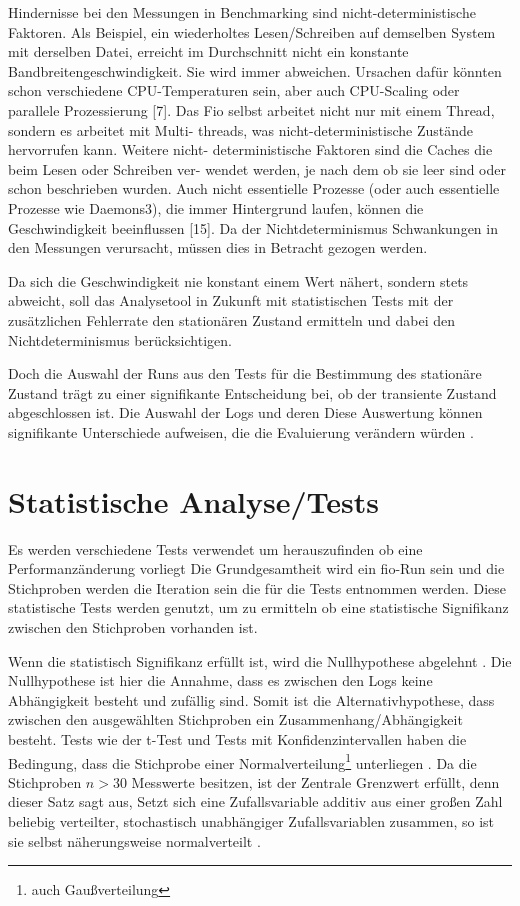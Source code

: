 Hindernisse bei den Messungen in Benchmarking sind nicht-deterministische Faktoren.
Als Beispiel, ein wiederholtes Lesen/Schreiben auf demselben System mit derselben Datei, erreicht im Durchschnitt nicht ein konstante Bandbreitengeschwindigkeit. 
Sie wird immer abweichen. Ursachen dafür könnten schon verschiedene CPU-Temperaturen sein, 
aber auch CPU-Scaling oder parallele Prozessierung [7]. Das Fio
selbst arbeitet nicht nur mit einem Thread, sondern es arbeitet mit Multi-
threads, was nicht-deterministische Zustände hervorrufen kann. Weitere nicht-
deterministische Faktoren sind die Caches die beim Lesen oder Schreiben ver-
wendet werden, je nach dem ob sie leer sind oder schon beschrieben wurden.
Auch nicht essentielle Prozesse (oder auch essentielle Prozesse wie Daemons3),
die immer Hintergrund laufen, können die Geschwindigkeit beeinflussen [15].
Da der Nichtdeterminismus Schwankungen in den Messungen verursacht, müssen dies in Betracht gezogen werden.

Da sich die Geschwindigkeit nie konstant einem Wert nähert, sondern stets
abweicht, soll das Analysetool in Zukunft mit statistischen Tests mit der zusätzlichen Fehlerrate den stationären
Zustand ermitteln und dabei den Nichtdeterminismus berücksichtigen.

Doch die Auswahl der Runs aus den Tests für die Bestimmung des stationäre Zustand trägt zu einer signifikante Entscheidung bei,
 ob der transiente Zustand abgeschlossen ist.
Die Auswahl der Logs und deren Diese Auswertung können signifikante Unterschiede aufweisen, die die Evaluierung
verändern würden \cite{when_stop_tests}.



\section{Statistische Analyse/Tests}
Es werden verschiedene Tests verwendet um herauszufinden ob eine Performanzänderung vorliegt \cite{statistically_rigorous}
Die Grundgesamtheit wird ein fio-Run sein und die Stichproben werden die Iteration sein die für die Tests entnommen werden.
Diese statistische Tests werden genutzt, um zu ermitteln ob eine statistische Signifikanz zwischen den Stichproben vorhanden ist.

Wenn die statistisch Signifikanz erfüllt ist, wird die Nullhypothese abgelehnt \cite{inferenzstatistik}.
Die Nullhypothese ist hier die Annahme, dass es zwischen den Logs keine Abhängigkeit besteht und zufällig sind.
Somit ist die Alternativhypothese, dass zwischen den ausgewählten Stichproben ein Zusammenhang/Abhängigkeit besteht.
Tests wie der t-Test und Tests mit Konfidenzintervallen haben die Bedingung, 
dass die Stichprobe einer Normalverteilung\footnote{auch Gaußverteilung} unterliegen \cite{inferenzstatistik}. 
Da die Stichproben $n > 30$ Messwerte besitzen, ist der Zentrale Grenzwert erfüllt, denn dieser Satz sagt aus, 
Setzt sich eine Zufallsvariable additiv aus einer großen Zahl beliebig verteilter, stochastisch unabhängiger
Zufallsvariablen zusammen, so ist sie selbst näherungsweise normalverteilt \cite{statistically_rigorous}.


